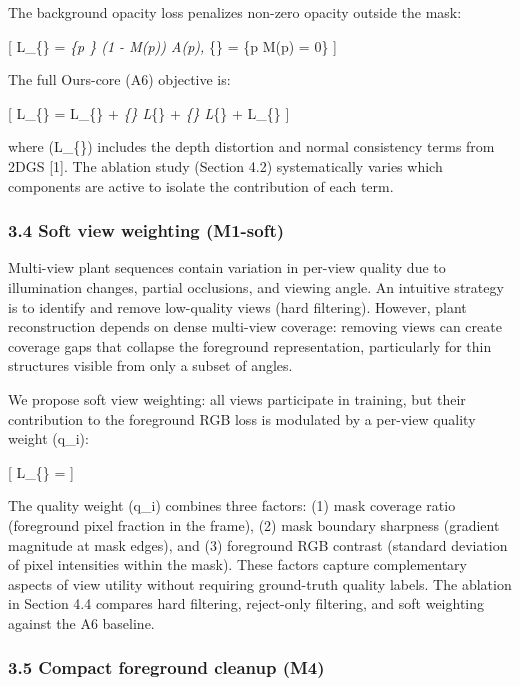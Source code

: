 \documentclass[11pt,a4paper]{article}
\begin{document}
The background opacity loss penalizes non-zero opacity outside the mask:

{[} L\_\{\} =  \sum\emph{\{p
\in \Omega\} (1 - M(p)) A(p), \quad \Omega}\{\} = \{p \mid M(p)
= 0\} {]}

The full Ours-core (A6) objective is:

{[} L\_\{\} = L\_\{\} +
\lambda\emph{\{\} L}\{\} +
\lambda\emph{\{\} L}\{\} + L\_\{\} {]}

where (L\_\{\}) includes the depth distortion and normal
consistency terms from 2DGS {[}1{]}. The ablation study (Section 4.2)
systematically varies which components are active to isolate the
contribution of each term.

\subsubsection{3.4 Soft view weighting
(M1-soft)}\label{soft-view-weighting-m1-soft}

Multi-view plant sequences contain variation in per-view quality due to
illumination changes, partial occlusions, and viewing angle. An
intuitive strategy is to identify and remove low-quality views (hard
filtering). However, plant reconstruction depends on dense multi-view
coverage: removing views can create coverage gaps that collapse the
foreground representation, particularly for thin structures visible from
only a subset of angles.

We propose soft view weighting: all views participate in training, but
their contribution to the foreground RGB loss is modulated by a per-view
quality weight (q\_i):

{[} L\_\{\} =
 {]}

The quality weight (q\_i) combines three factors: (1) mask coverage
ratio (foreground pixel fraction in the frame), (2) mask boundary
sharpness (gradient magnitude at mask edges), and (3) foreground RGB
contrast (standard deviation of pixel intensities within the mask).
These factors capture complementary aspects of view utility without
requiring ground-truth quality labels. The ablation in Section 4.4
compares hard filtering, reject-only filtering, and soft weighting
against the A6 baseline.

\subsubsection{3.5 Compact foreground cleanup
(M4)}\label{compact-foreground-cleanup-m4}
\end{document}
